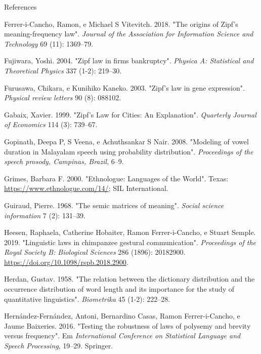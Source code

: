 \documentclass[
  ignorenonframetext,
  aspectratio=169]{beamer}
\newlength{\cslhangindent}
\newlength{\cslentryspacingunit} %
\newenvironment{CSLReferences}[2] %
 {%
  \setlength{\parindent}{0pt}
  \ifodd #1
  \let\oldpar\par
  \def\par{\hangindent=\cslhangindent\oldpar}
  \fi
  \setlength{\parskip}{#2\cslentryspacingunit}
 }%
 {}
\begin{document}
\begin{frame}[allowframebreaks]{References}
\begin{CSLReferences}{1}{0}
\leavevmode{}%
Ferrer-i-Cancho, Ramon, e Michael S Vitevitch. 2018. {"The origins of
Zipf's meaning-frequency law"}. \emph{Journal of the Association for
Information Science and Technology} 69 (11): 1369--79.

\leavevmode{}%
Fujiwara, Yoshi. 2004. {"Zipf law in firms bankruptcy"}. \emph{Physica
A: Statistical and Theoretical Physics} 337 (1-2): 219--30.

\leavevmode{}%
Furusawa, Chikara, e Kunihiko Kaneko. 2003. {"Zipf's law in gene
expression"}. \emph{Physical review letters} 90 (8): 088102.

\leavevmode{}%
Gabaix, Xavier. 1999. {"Zipf's Law for Cities: An Explanation"}.
\emph{Quarterly Journal of Economics} 114 (3): 739--67.

\leavevmode{}%
Gopinath, Deepa P, S Veena, e Achuthsankar S Nair. 2008. {"Modeling of
vowel duration in Malayalam speech using probability distribution"}.
\emph{Proceedings of the speech prosody, Campinas, Brazil}, 6--9.

\leavevmode{}%
Grimes, Barbara F. 2000. {"Ethnologue: Languages of the World"}. Texas:
\url{https://www.ethnologue.com/14/}; SIL International.

\leavevmode{}%
Guiraud, Pierre. 1968. {"The semic matrices of meaning"}. \emph{Social
science information} 7 (2): 131--39.

\leavevmode{}%
Heesen, Raphaela, Catherine Hobaiter, Ramon Ferrer-i-Cancho, e Stuart
Semple. 2019. {"Linguistic laws in chimpanzee gestural communication"}.
\emph{Proceedings of the Royal Society B: Biological Sciences} 286
(1896): 20182900. \url{https://doi.org/10.1098/rspb.2018.2900}.

\leavevmode{}%
Herdan, Gustav. 1958. {"The relation between the dictionary distribution
and the occurrence distribution of word length and its importance for
the study of quantitative linguistics"}. \emph{Biometrika} 45 (1-2):
222--28.

\leavevmode{}%
Hernández-Fernández, Antoni, Bernardino Casas, Ramon Ferrer-i-Cancho, e
Jaume Baixeries. 2016. {"Testing the robustness of laws of polysemy and
brevity versus frequency"}. Em \emph{International Conference on
Statistical Language and Speech Processing}, 19--29. Springer.


\end{CSLReferences}
\end{frame}
\end{document}
